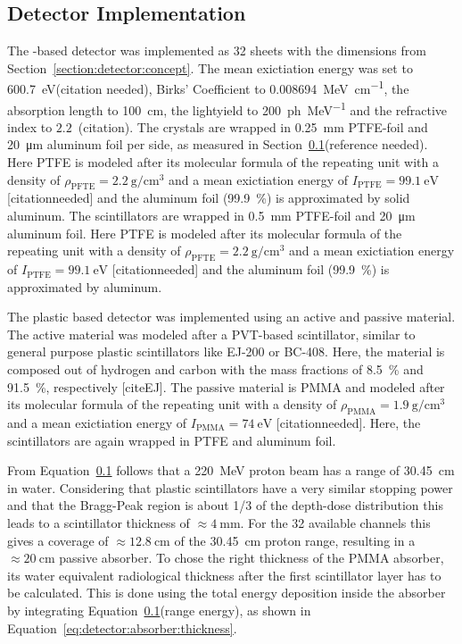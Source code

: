 \subsection{Detector Implementation}
The -based detector was implemented as 32  sheets with the dimensions from Section~\ref{section:detector:concept}.
The mean exictiation energy was set to \SI{600.7}{\electronvolt}(citation needed), Birks' Coefficient to \SI{0.008694}{\mega\electronvolt\per\centi\meter}, the absorption length to \SI{100}{\centi\meter}, the lightyield to \SI{200}{ph\per\mega\electronvolt} and the refractive index to $2.2$~(citation). 
The crystals are wrapped in \SI{0.25}{\mm} PTFE-foil and \SI{20}{\um} aluminum foil per side, as measured in Section~\ref{}(reference needed).
Here PTFE is modeled after its molecular formula of the repeating unit  with a density of $\rho_{\text{PFTE}}=\SI{2.2}{\gram\per\cm\cubed}$ and a mean exictiation energy of $I_{\text{PTFE}} = \SI{99.1}{\electronvolt}$  [citationneeded] and the aluminum foil (\SI{99.9}{\percent}) is approximated by solid aluminum. 
The scintillators are wrapped in \SI{0.5}{\mm} PTFE-foil and \SI{20}{\um} aluminum foil.
Here PTFE is modeled after its molecular formula of the repeating unit  with a density of $\rho_{\text{PFTE}}=\SI{2.2}{\gram\per\cm\cubed}$ and a mean exictiation energy of $I_{\text{PTFE}} = \SI{99.1}{\electronvolt}$  [citationneeded] and the aluminum foil (\SI{99.9}{\percent}) is approximated by aluminum. 

The plastic based detector was implemented using an active and passive material.
The active material was modeled after a PVT-based scintillator, similar to general purpose plastic scintillators like EJ-200 or BC-408.
Here, the material is composed out of hydrogen and carbon with the mass fractions of \SI{8.5}{\percent} and \SI{91.5}{\percent}, respectively [citeEJ].
The passive material is PMMA and modeled after its molecular formula of the repeating unit  with a density of $\rho_{\text{PMMA}}=\SI{1.9}{\gram\per\cm\cubed}$ and a mean exictiation energy of $I_{\text{PMMA}} = \SI{74}{\electronvolt}$ [citationneeded]. 
Here, the scintillators are again wrapped in PTFE and aluminum foil.

From Equation~\ref{} follows that a \SI{220}{\mega\electronvolt} proton beam has a range of \SI{30.45}{\cm} in water.
Considering that plastic scintillators have a very similar stopping power and that the Bragg-Peak region is about 1/3 of the depth-dose distribution this leads to a scintillator thickness of $\approx\SI{4}{\mm}$.
For the 32 available channels this gives a coverage of $\approx \SI{12.8}{\centi\meter}$ of the \SI{30.45}{\centi\meter} proton range, resulting in a $\approx\SI{20}{\cm}$ passive absorber.
To chose the right thickness of the PMMA absorber, its water equivalent radiological thickness after the first scintillator layer has to be calculated.
This is done using the total energy deposition inside the absorber by integrating Equation~\ref{}(range energy), as shown in Equation~\ref{eq:detector:absorber:thickness}.

